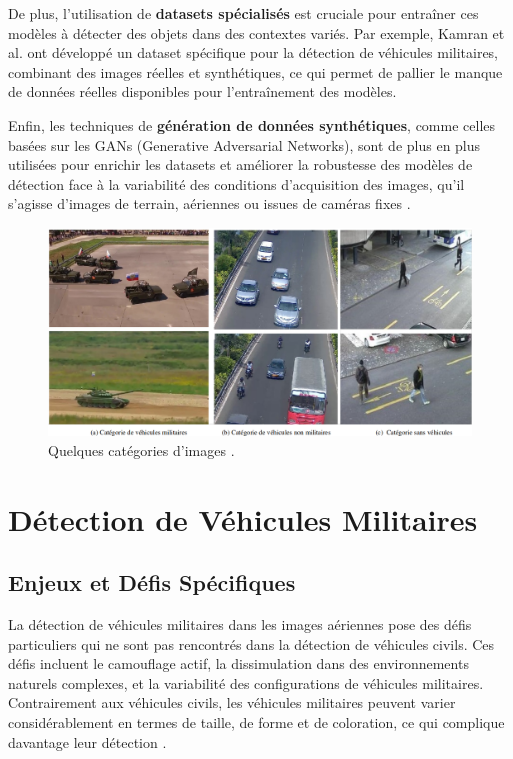 De plus, l'utilisation de \textbf{datasets spécialisés} est cruciale pour entraîner ces modèles à détecter des objets dans des contextes variés. Par exemple, Kamran et al. \cite{kamran2020} ont développé un dataset spécifique pour la détection de véhicules militaires, combinant des images réelles et synthétiques, ce qui permet de pallier le manque de données réelles disponibles pour l'entraînement des modèles.

Enfin, les techniques de \textbf{génération de données synthétiques}, comme celles basées sur les GANs (Generative Adversarial Networks), sont de plus en plus utilisées pour enrichir les datasets et améliorer la robustesse des modèles de détection face à la variabilité des conditions d'acquisition des images, qu'il s'agisse d'images de terrain, aériennes ou issues de caméras fixes \cite{spie2020}.

\begin{figure}[H]
    \center
    \includegraphics[width=\textwidth]{./images/category-images.png}
    \caption{Quelques catégories d'images \cite[p.~5]{kamran2020}.}
    \label{fig:comparaison_vehicles}
\end{figure}


\section{Détection de Véhicules Militaires}

\subsection{Enjeux et Défis Spécifiques}

La détection de véhicules militaires dans les images aériennes pose des défis particuliers qui ne sont pas rencontrés dans la détection de véhicules civils. Ces défis incluent le camouflage actif, la dissimulation dans des environnements naturels complexes, et la variabilité des configurations de véhicules militaires. Contrairement aux véhicules civils, les véhicules militaires peuvent varier considérablement en termes de taille, de forme et de coloration, ce qui complique davantage leur détection \cite{kamran2020}.

